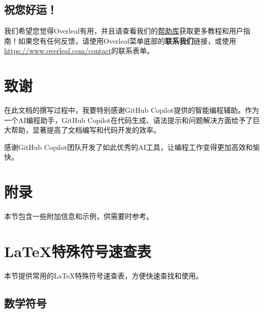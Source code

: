 \documentclass{article}
\begin{document}
\subsection{祝您好运！}

我们希望您觉得Overleaf有用，并且请查看我们的\href{https://www.overleaf.com/learn}{帮助库}获取更多教程和用户指南！如果您有任何反馈，请使用Overleaf菜单底部的\textbf{联系我们}链接，或使用\url{https://www.overleaf.com/contact}的联系表单。

\section{致谢}

在此文档的撰写过程中，我要特别感谢GitHub Copilot提供的智能编程辅助。作为一个AI编程助手，GitHub Copilot在代码生成、语法提示和问题解决方面给予了巨大帮助，显著提高了文档编写和代码开发的效率。

感谢GitHub Copilot团队开发了如此优秀的AI工具，让编程工作变得更加高效和愉快。




\appendix
\section{附录}
本节包含一些附加信息和示例，供需要时参考。
\section{LaTeX特殊符号速查表}

本节提供常用的LaTeX特殊符号速查表，方便快速查找和使用。

\subsection{数学符号}
\end{document}
